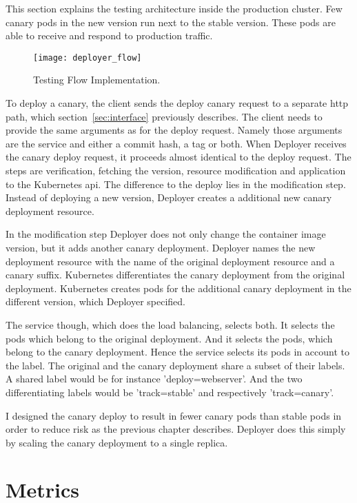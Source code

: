 This section explains the testing architecture inside the production cluster. Few canary
pods in the new version run next to the stable version. These pods are able to receive and
respond to production traffic.

\begin{figure}[htbp] \centering \texttt{[image: deployer\_flow]}
  \caption[nprtflow]{Testing Flow Implementation.}
  \label{fig:testing_flow}
\end{figure}


To deploy a canary, the client sends the deploy canary request to a separate http path,
which section~\ref{sec:interface} previously describes. The client needs to provide the
same arguments as for the deploy request. Namely those arguments are the service and
either a commit hash, a tag or both. When Deployer receives the canary deploy request, it
proceeds almost identical to the deploy request. The steps are verification, fetching the
version, resource modification and application to the Kubernetes api. The difference to
the deploy lies in the modification step. Instead of deploying a new version, Deployer
creates a additional new canary deployment resource.

In the modification step Deployer does not only change the container image version, but it
adds another canary deployment. Deployer names the new deployment resource with the name
of the original deployment resource and a canary suffix. Kubernetes differentiates the
canary deployment from the original deployment. Kubernetes creates pods for the additional
canary deployment in the different version, which Deployer specified.

The service though, which does the load balancing, selects both. It selects the pods which
belong to the original deployment. And it selects the pods, which belong to the canary
deployment. Hence the service selects its pods in account to the label. The original and
the canary deployment share a subset of their labels. A shared label would be for instance
'deploy=webserver'. And the two differentiating labels would be 'track=stable' and
respectively 'track=canary'.

I designed the canary deploy to result in fewer canary pods than stable pods in order to
reduce risk as the previous chapter describes. Deployer does this simply by scaling the
canary deployment to a single replica.

\section{Metrics}

